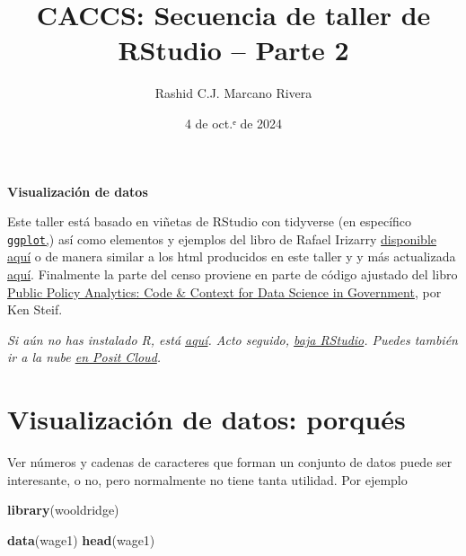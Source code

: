 \documentclass[
]{article}
\title{CACCS: Secuencia de taller de RStudio -- Parte 2}
\author{Rashid C.J. Marcano Rivera}
\date{4 de oct.ᵉ de 2024}
\newenvironment{Shaded}{\begin{snugshade}}{\end{snugshade}}
\newcommand{\FunctionTok}[1]{\textcolor[rgb]{0.13,0.29,0.53}{\textbf{#1}}}
\newcommand{\NormalTok}[1]{#1}
\begin{document}
\maketitle

{
\setcounter{tocdepth}{2}
\tableofcontents
}
\textbf{Visualización de datos}

Este taller está basado en viñetas de RStudio con tidyverse (en
específico \href{https://ggplot2.tidyverse.org}{\texttt{ggplot},}) así
como elementos y ejemplos del libro de Rafael Irizarry
\href{https://leanpub.com/dslibro}{disponible aquí} o de manera similar
a los html producidos en este taller y y más actualizada
\href{https://rafalab.dfci.harvard.edu/dslibro/}{aquí}. Finalmente la
parte del censo proviene en parte de código ajustado del libro
\href{https://urbanspatial.github.io/PublicPolicyAnalytics/introduction.html}{Public
Policy Analytics: Code \& Context for Data Science in Government}, por
Ken Steif.

\emph{Si aún no has instalado R, está
\href{http://cran.us.r-project.org/}{aquí}. Acto seguido,
\href{https://posit.co/download/rstudio-desktop/}{baja RStudio}. Puedes
también ir a la nube \href{https://posit.cloud/}{en Posit Cloud}.}

\section{Visualización de datos:
porqués}\label{visualizaciuxf3n-de-datos-porquuxe9s}

Ver números y cadenas de caracteres que forman un conjunto de datos
puede ser interesante, o no, pero normalmente no tiene tanta utilidad.
Por ejemplo

\begin{Shaded}
\begin{Highlighting}[]
\FunctionTok{library}\NormalTok{(wooldridge)}

\FunctionTok{data}\NormalTok{(wage1)}
\FunctionTok{head}\NormalTok{(wage1)}
\end{Highlighting}
\end{Shaded}
\end{document}
